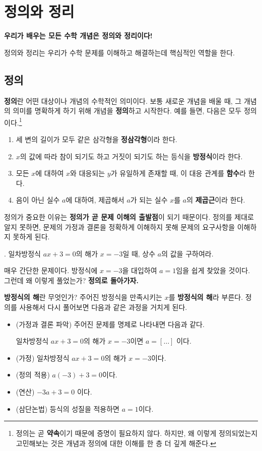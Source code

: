 \chapter{정의와 정리}

\textbf{우리가 배우는 모든 수학 개념은 정의와 정리이다!}

정의와 정리는 우리가 수학 문제를 이해하고 해결하는데 핵심적인 역할을 한다.

\section{정의}

\textbf{정의}란 어떤 대상이나 개념의 수학적인 의미이다. 보통 새로운 개념을 배울 때, 그 개념의 의미를 명확하게 하기 위해 개념을 \textbf{정의}하고 시작한다. 예를 들면, 다음은 모두 정의이다.\footnote{정의는 곧 \textbf{약속}이기 때문에 증명이 필요하지 않다. 하지만, 왜 이렇게 정의되었는지 고민해보는 것은 개념과 정의에 대한 이해를 한 층 더 깊게 해준다.}

\begin{enumerate}
    \item 세 변의 길이가 모두 같은 삼각형을 \textbf{정삼각형}이라 한다.
    \item \(x\)의 값에 따라 참이 되기도 하고 거짓이 되기도 하는 등식을 \textbf{방정식}이라 한다.
    \item 모든 \(x\)에 대하여 \(x\)와 대응되는 \(y\)가 유일하게 존재할 때, 이 대응 관계를 \textbf{함수}라 한다.
    \item 음이 아닌 실수 \(a\)에 대하여, 제곱해서 \(a\)가 되는 실수 \(x\)를 \(a\)의 \textbf{제곱근}이라 한다.
\end{enumerate}

정의가 중요한 이유는 \textbf{정의가 곧 문제 이해의 출발점}이 되기 때문이다. 정의를 제대로 알지 못하면, 문제의 가정과 결론을 정확하게 이해하지 못해 문제의 요구사항을 이해하지 못하게 된다.

\ex. 일차방정식 \(ax + 3 = 0\)의 해가 \(x = -3\)일 때, 상수 \(a\)의 값을 구하여라.

\newpage

매우 간단한 문제이다. 방정식에 \(x = -3\)을 대입하여 \(a = 1\)임을 쉽게 찾았을 것이다. 그런데 왜 이렇게 풀었는가? \textbf{정의로 돌아가자.}

\textbf{방정식의 해}란 무엇인가? 주어진 방정식을 만족시키는 \(x\)를 \textbf{방정식의 해}라 부른다. 정의를 사용해서 다시 풀어보면 다음과 같은 과정을 거치게 된다.

\begin{itemize}
    \item (가정과 결론 파악) 주어진 문제를 명제로 나타내면 다음과 같다.
          \begin{center}
              일차방정식 \(ax + 3 = 0\)의 해가 \(x = -3\)이면 \(a = [\dots]\) 이다.
          \end{center}
    \item (가정) 일차방정식 \(ax + 3 = 0\)의 해가 \(x = -3\)이다.
    \item (정의 적용) \(a(-3) + 3 = 0\)이다.
    \item (연산) \(-3a + 3 = 0\) 이다.
    \item (삼단논법) 등식의 성질을 적용하면 \(a = 1\)이다.
\end{itemize}

